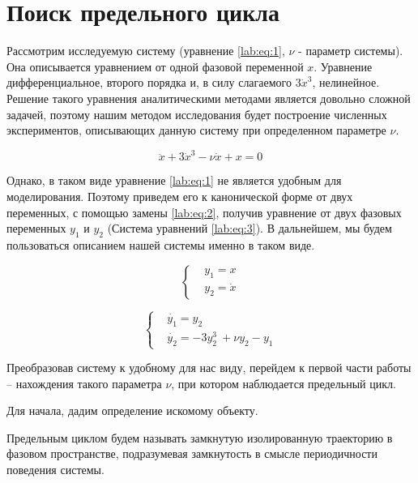 \chapter{Поиск предельного цикла}

Рассмотрим исследуемую систему (уравнение \ref{lab:eq:1},
$\nu$ - параметр системы). Она описывается
уравнением от одной фазовой переменной $x$. Уравнение дифференциальное, второго
порядка и, в силу слагаемого $3\dot{x}^3$, нелинейное. Решение такого уравнения
аналитическими методами является довольно сложной задачей, поэтому нашим
методом исследования будет построение численных экспериментов, описывающих
данную систему при определенном параметре $\nu$.

\begin{equation}\label{lab:eq:1}
  \ddot{x} + 3 \dot{x}^3 - \nu\dot{x} + x = 0
\end{equation}

Однако, в таком виде уравнение \ref{lab:eq:1} не является удобным для
моделирования. Поэтому приведем его к канонической форме от двух переменных, с
помощью замены \ref{lab:eq:2}, получив уравнение от двух фазовых переменных
$y_1$ и $y_2$ (Система уравнений \ref{lab:eq:3}). В дальнейшем, мы будем
пользоваться описанием нашей системы именно в таком виде.

\begin{equation}\label{lab:eq:2}
  \begin{cases}
    &y_1 = x \\
    &y_2 = \dot{x}
  \end{cases}
\end{equation}

\begin{equation}\label{lab:eq:3}
  \begin{cases}
    &\dot{y_1} = y_2 \\
    &\dot{y_2} = -3y_2^3\ + \nu y_2 - y_1
  \end{cases}
\end{equation}

Преобразовав систему к удобному для нас виду, перейдем к первой части работы --
нахождения такого параметра $\nu$, при котором наблюдается предельный цикл.

Для начала, дадим определение искомому объекту.

\begin{definition}\label{lab:def:cycle}
  Предельным циклом будем называть замкнутую изолированную траекторию
  в фазовом пространстве, подразумевая замкнутость в смысле периодичности
  поведения системы.
\end{definition}

